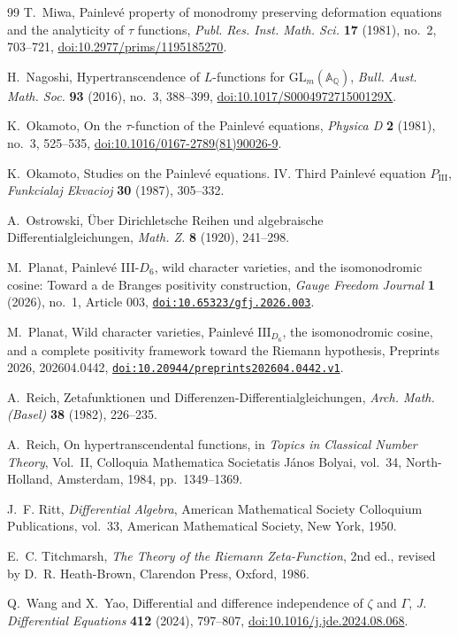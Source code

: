 \documentclass[11pt]{article}
\numberwithin{equation}{section}
\theoremstyle{definition}
\theoremstyle{remark}
\begin{document}
\begin{thebibliography}{99}
T.~Miwa,
Painlev\'e property of monodromy preserving deformation equations and the analyticity of
$\tau$ functions,
\emph{Publ. Res. Inst. Math. Sci.} \textbf{17} (1981), no.~2, 703--721,
\href{https://doi.org/10.2977/prims/1195185270}{doi:10.2977/prims/1195185270}.

H.~Nagoshi,
Hypertranscendence of $L$-functions for $\mathrm{GL}_m(\mathbb A_{\mathbb Q})$,
\emph{Bull. Aust. Math. Soc.} \textbf{93} (2016), no.~3, 388--399,
\href{https://doi.org/10.1017/S000497271500129X}{doi:10.1017/S000497271500129X}.

K.~Okamoto,
On the $\tau$-function of the Painlev\'e equations,
\emph{Physica D} \textbf{2} (1981), no.~3, 525--535,
\href{https://doi.org/10.1016/0167-2789(81)90026-9}{doi:10.1016/0167-2789(81)90026-9}.

K.~Okamoto,
Studies on the Painlev\'e equations. IV. Third Painlev\'e equation $P_{\mathrm{III}}$,
\emph{Funkcialaj Ekvacioj} \textbf{30} (1987), 305--332.

A.~Ostrowski,
\"Uber Dirichletsche Reihen und algebraische Differentialgleichungen,
\emph{Math. Z.} \textbf{8} (1920), 241--298.

M.~Planat,
Painlev\'e III-$D_6$, wild character varieties, and the isomonodromic cosine: Toward a de Branges
positivity construction,
\emph{Gauge Freedom Journal} \textbf{1} (2026), no.~1, Article 003,
\href{https://doi.org/10.65323/gfj.2026.003}{\nolinkurl{doi:10.65323/gfj.2026.003}}.

M.~Planat,
Wild character varieties, Painlev\'e $\mathrm{III}_{D_6}$, the isomonodromic cosine, and a complete
positivity framework toward the Riemann hypothesis,
Preprints 2026, 202604.0442,
\href{https://doi.org/10.20944/preprints202604.0442.v1}
  {\nolinkurl{doi:10.20944/preprints202604.0442.v1}}.

A.~Reich,
Zetafunktionen und Differenzen-Differentialgleichungen,
\emph{Arch. Math. (Basel)} \textbf{38} (1982), 226--235.

A.~Reich,
On hypertranscendental functions,
in \emph{Topics in Classical Number Theory}, Vol.~II,
Colloquia Mathematica Societatis J\'anos Bolyai, vol.~34,
North-Holland, Amsterdam, 1984, pp.~1349--1369.

J.~F. Ritt,
\emph{Differential Algebra},
American Mathematical Society Colloquium Publications, vol.~33,
American Mathematical Society, New York, 1950.

E.~C. Titchmarsh,
\emph{The Theory of the Riemann Zeta-Function}, 2nd ed., revised by D.~R. Heath-Brown,
Clarendon Press, Oxford, 1986.

Q.~Wang and X.~Yao,
Differential and difference independence of $\zeta$ and $\Gamma$,
\emph{J. Differential Equations} \textbf{412} (2024), 797--807,
\href{https://doi.org/10.1016/j.jde.2024.08.068}{doi:10.1016/j.jde.2024.08.068}.

\end{thebibliography}
\endgroup
\end{document}
